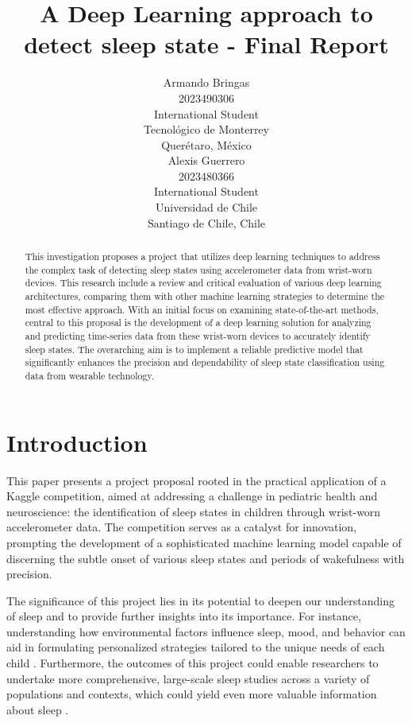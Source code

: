\documentclass{article}
\title{A Deep Learning approach to detect sleep state - Final Report}
\author{%
  Armando Bringas \\
  2023490306 \\
  International Student \\
  Tecnológico de Monterrey \\
  Querétaro, México \\
  \And
  Alexis Guerrero \\
  2023480366 \\
  International Student \\
  Universidad de Chile \\
  Santiago de Chile, Chile \\
}
\begin{document}
\maketitle





\begin{abstract}
This investigation proposes a project that utilizes deep learning techniques to address the complex task of detecting sleep states using accelerometer data from wrist-worn devices. This research include a review and critical evaluation of various deep learning architectures, comparing them with other machine learning strategies to determine the most effective approach. With an initial focus on examining state-of-the-art methods, central to this proposal is the development of a deep learning solution for analyzing and predicting time-series data from these wrist-worn devices to accurately identify sleep states. The overarching aim is to implement a reliable predictive model that significantly enhances the precision and dependability of sleep state classification using data from wearable technology.
\end{abstract}


\section{Introduction}

This paper presents a project proposal rooted in the practical application of a Kaggle competition, aimed at addressing a challenge in pediatric health and neuroscience: the identification of sleep states in children through wrist-worn accelerometer data. The competition serves as a catalyst for innovation, prompting the development of a sophisticated machine learning model capable of discerning the subtle onset of various sleep states and periods of wakefulness with precision.

The significance of this project lies in its potential to deepen our understanding of sleep and to provide further insights into its importance. For instance, understanding how environmental factors influence sleep, mood, and behavior can aid in formulating personalized strategies tailored to the unique needs of each child \cite{child-mind-institute-detect-sleep-states}. Furthermore, the outcomes of this project could enable researchers to undertake more comprehensive, large-scale sleep studies across a variety of populations and contexts, which could yield even more valuable information about sleep \cite{child-mind-institute-detect-sleep-states}.
\end{document}
